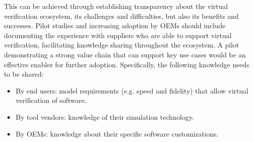 This can be achieved through establishing transparency about the virtual verification ecosystem, its challenges and difficulties, but also its benefits and successes. 
Pilot studies and increasing adoption by OEMs should include documenting the experience with suppliers who are able to support virtual verification, facilitating knowledge sharing throughout the ecosystem.
A pilot demonstrating a strong value chain that can support key use cases would be an effective enabler for further adoption.
Specifically, the following knowledge needs to be shared:
\begin{itemize}
  \item By end users: model requirements (e.g. speed and fidelity) that allow virtual verification of software.
  \item By tool vendors: knowledge of their simulation technology.
  \item By OEMs: knowledge about their specific software customizations.
\end{itemize}